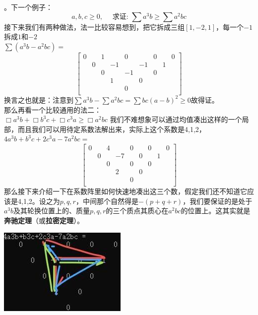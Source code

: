 \documentclass[UTF8]{ctexart}
\begin{document}
。下一个例子：
$$ a, b, c \geq 0, \quad \text { 求证: } \displaystyle \sum  a^{3} b \geq \displaystyle \sum  a^{2} b c
$$
接下来我们有两种做法，法一比较容易想到，把它拆成三组$ [1,-2,1] $，每一个$ -1 $拆成$ 1 $和$ -2 $\\
$ \displaystyle \sum (a^{3} b-a^{2} b c)= $
\renewcommand*{\arraystretch}{1.732}\[\left[\begin{matrix}
	0& &1& &0& &0& &0\\
	&0& &-1& &-1& &1&\\
	& &0& &-1& &0& &\\
	& & &1& &0& & &\\
	& & & &0& & & &\\
\end{matrix}\right]\]
换言之也就是：注意到$ \displaystyle \sum a^{3} b-\displaystyle \sum a^{2} b c=\displaystyle \sum b c(a-b)^{2} \geq 0 $故得证。\\
那么再看一个比较通用的法二：\\
$ \Box a^{3} b+\Box b^{3} c+\Box c^{3} a \geq \Box a^{2} b c $
我们不难想象可以通过均值凑出这样的一个局部，而且我们可以用待定系数法解出来，实际上这个系数是4,1,2，
$ 4a^{3}b+b^{3}c+2c^{3}a-7a^{2}bc= $\\
\renewcommand*{\arraystretch}{1.732}\[\left[\begin{matrix}
	0& &4& &0& &0& &0\\
	& 0& &-7& &0& &1&\\
	& &0& &0& &0& &\\
	& & &2& &0& & &\\
	& & & &0& & & &\\
\end{matrix}\right]\]
那么接下来介绍一下在系数阵里如何快速地凑出这三个数，假定我们还不知道它应该是4,1,2。设之为$ p,q,r $，中间那个自然得是$ -(p+q+r) $，我们要保证的是处于$ a^{3}b $及其轮换位置上的、质量$ p,q,r $的三个质点其质心在$ a^{2}bc $的位置上。这其实就是\textbf{奔驰定理}（或\textbf{拉密定理}）。

\begin{center}
	\includegraphics[width=0.4\linewidth]{0130}
\end{center}
\end{document}
